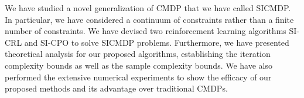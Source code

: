 We have studied a novel generalization of CMDP that we have called SICMDP. In particular, we have considered a continuum of constraints rather than a finite number of constraints.
We have devised two reinforcement learning algorithms SI-CRL and SI-CPO to solve SICMDP problems.
Furthermore, we have presented theoretical analysis for our proposed algorithms, establishing the iteration complexity bounds as well as the sample complexity bounds.
We have also performed the extensive numerical experiments to show the efficacy of our proposed methods and its advantage over traditional CMDPs.

